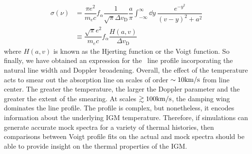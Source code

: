 \begin{align}
\sigma(\nu) &= \dfrac{\pi e^2}{m_e c}f_{\alpha}\dfrac{1}{\sqrt{\pi}\Delta v_{\text{D}}} \dfrac{a}{\pi}\int_{-\infty}^{\infty}\dd y\ \dfrac{e^{-y^2}}{(v-y)^2+a^2}\\ 
&\equiv \dfrac{\sqrt{\pi} e^2}{m_e c} f_{\alpha}\dfrac{H(a,v)}{\Delta v_{\text{D}}}
\end{align}
where $H(a,v)$ is known as the Hjerting function  or the Voigt function. So finally, we have obtained an expression for the \lya\ line profile incorporating the natural line width and Doppler broadening. Overall, the effect of the temperature acts to smear out the absorption line on scales of order $\sim 10\text{km}/\text{s}$ from line center. The greater the temperature, the larger the Doppler parameter and the greater the extent of the smearing. At scales $\gtrsim 100\text{km}/\text{s}$, the damping wing dominates the line profile. The profile is complex, but nonetheless, it encodes information about the underlying IGM temperature. Therefore, if simulations can generate accurate mock spectra for a variety of thermal histories, then comparisons between Voigt profile fits on the actual and mock spectra should be able to provide insight on the thermal properties of the IGM. 


